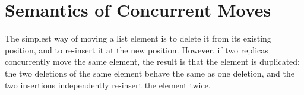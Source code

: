 \documentclass[sigplan,10pt]{acmart}
\begin{document}
\section{Semantics of Concurrent Moves}\label{sec:semantics}

The simplest way of moving a list element is to delete it from its existing position, and to re-insert it at the new position.
However, if two replicas concurrently move the same element, the result is that the element is duplicated: the two deletions of the same element behave the same as one deletion, and the two insertions independently re-insert the element twice.

\end{document}
